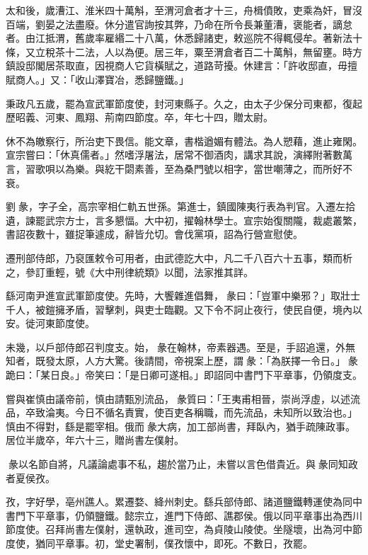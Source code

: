 \begin{pinyinscope}
 太和後，歲漕江、淮米四十萬斛，至渭河倉者才十三，舟楫僨敗，吏乘為奸，冒沒百端，劉晏之法盡廢。休分遣官詢按其弊，乃命在所令長兼董漕，褒能者，謫怠者。由江抵渭，舊歲率雇緡二十八萬，休悉歸諸吏，敕巡院不得輒侵牟。著新法十條，又立稅茶十二法，人以為便。居三年，粟至渭倉者百二十萬斛，無留壅。時方鎮設邸閣居茶取直，因視商人它貨橫賦之，道路苛擾。休建言：「許收邸直，毋擅賦商人。」又：「收山澤寶冶，悉歸鹽鐵。」



 秉政凡五歲，罷為宣武軍節度使，封河東縣子。久之，由太子少保分司東都，復起歷昭義、河東、鳳翔、荊南四節度。卒，年七十四，贈太尉。



 休不為皦察行，所治吏下畏信。能文章，書楷遒媚有體法。為人愬藉，進止雍閑。宣宗嘗曰：「休真儒者。」然嗜浮屠法，居常不御酒肉，講求其說，演繹附著數萬言，習歌唄以為樂。與紇干閟素善，至為桑門號以相字，當世嘲薄之，而所好不衰。



 劉彖，字子全，高宗宰相仁軌五世孫。第進士，鎮國陳夷行表為判官。入遷左拾遺，諫罷武宗方士，言多懇愊。大中初，擢翰林學士。宣宗始復關隴，裁處叢繁，書詔夜數十，雖捉筆遽成，辭皆允切。會伐黨項，詔為行營宣慰使。



 遷刑部侍郎，乃裒匯敕令可用者，由武德訖大中，凡二千八百六十五事，類而析之，參訂重輕，號《大中刑律統類》以聞，法家推其詳。



 繇河南尹進宣武軍節度使。先時，大饗雜進倡舞，彖曰：「豈軍中樂邪？」取壯士千人，被鎧擁矛盾，習擊刺，與吏士臨觀。又下令不訶止夜行，使民自便，境內以安。徙河東節度使。



 未幾，以戶部侍郎召判度支。始，彖在翰林，帝素器遇。至是，手詔追還，外無知者，既發太原，人方大驚。後請間，帝視案上歷，謂彖：「為朕擇一令日。」彖跪曰：「某日良。」帝笑曰：「是日卿可遂相。」即詔同中書門下平章事，仍領度支。



 嘗與崔慎由議帝前，慎由請甄別流品，彖質曰：「王夷甫相晉，崇尚浮虛，以述流品，卒致淪夷。今日不循名責實，使百吏各稱職，而先流品，未知所以致治也。」慎由不得對，繇是罷宰相。俄而彖大病，加工部尚書，拜臥內，猶手疏陳政事。居位半歲卒，年六十三，贈尚書左僕射。



 彖以名節自將，凡議論處事不私，趨於當乃止，未嘗以言色借貴近。與彖同知政者夏侯孜。



 孜，字好學，亳州譙人。累遷婺、絳州刺史。繇兵部侍郎、諸道鹽鐵轉運使為同中書門下平章事，仍領鹽鐵。懿宗立，進門下侍郎、譙郡侯。俄以同平章事出為西川節度使。召拜尚書左僕射，還執政，進司空，為貞陵山陵使。坐隧壞，出為河中節度使，猶同平章事。初，堂史署制，僕孜懷中，即死。不數日，孜罷。




\end{pinyinscope}
